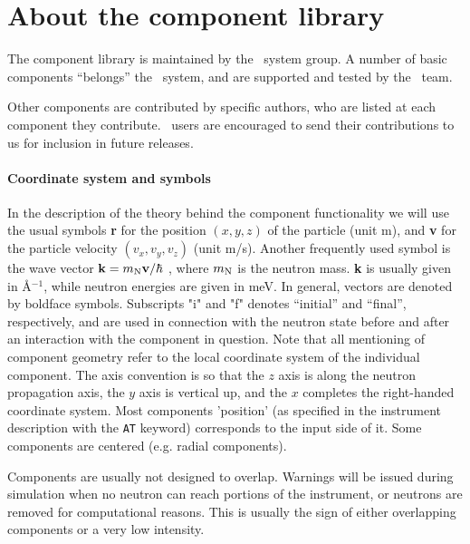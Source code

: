 
\chapter{About the component library}
\label{c:components}
The component library is
maintained by the \MCS\ system group. A number of basic components
``belongs'' the \MCS\ system, and are supported and tested by the \MCS\
team.

Other components are contributed
by specific authors, who are listed at each component
they contribute.
\MCS\ users are encouraged to send their
contributions to us for inclusion in future releases.

\subsubsection{Coordinate system and symbols}
In the description of the theory behind the component functionality
we will use the usual symbols {\bf r} for the position
$(x,y,z)$ of the particle (unit m), and {\bf v} for
the particle velocity $(v_x, v_y, v_z)$ (unit m/s).
Another frequently used symbol is
the wave vector ${\bf k} = m_{\rm N} {\bf v}/\hbar$ , where
$m_{\rm N}$ is the neutron mass. {\bf k} is usually given in
\AA$^{-1}$, while neutron energies are given in meV.
In general, vectors are denoted by boldface symbols.
Subscripts "i" and "f" denotes ``initial'' and ``final'', respectively,
and are used in connection with the neutron state before and after
an interaction with the component in question.
Note that all mentioning of component geometry refer to
the local coordinate system of the individual component.
The axis convention is so that the $z$ axis is along
the neutron propagation axis, the $y$ axis is vertical up,
and the $x$ completes the right-handed coordinate system.
Most components 'position' (as specified in the instrument description with the \verb+AT+ keyword) corresponds to the input side of it. Some components are centered (e.g. radial components).
\index{Symbols}\index{Coordinates system}

Components are usually not designed to overlap. Warnings will be issued during simulation when no neutron can reach portions of the instrument, or neutrons are removed for computational reasons. This is usually the sign of either overlapping components or a very low intensity.

